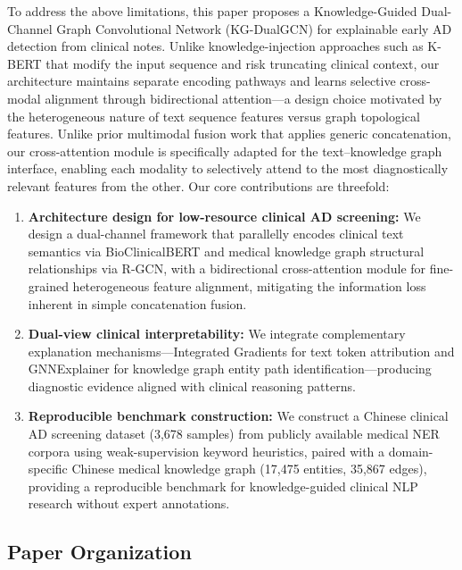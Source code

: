 \documentclass[11pt,onecolumn,a4paper]{article}
\begin{document}
To address the above limitations, this paper proposes a Knowledge-Guided Dual-Channel Graph Convolutional Network (KG-DualGCN) for explainable early AD detection from clinical notes. Unlike knowledge-injection approaches such as K-BERT that modify the input sequence and risk truncating clinical context, our architecture maintains separate encoding pathways and learns selective cross-modal alignment through bidirectional attention---a design choice motivated by the heterogeneous nature of text sequence features versus graph topological features. Unlike prior multimodal fusion work that applies generic concatenation, our cross-attention module is specifically adapted for the text--knowledge graph interface, enabling each modality to selectively attend to the most diagnostically relevant features from the other. Our core contributions are threefold:

\begin{enumerate}[leftmargin=*]
    \item \textbf{Architecture design for low-resource clinical AD screening:} We design a dual-channel framework that parallelly encodes clinical text semantics via BioClinicalBERT and medical knowledge graph structural relationships via R-GCN, with a bidirectional cross-attention module for fine-grained heterogeneous feature alignment, mitigating the information loss inherent in simple concatenation fusion.
    
    \item \textbf{Dual-view clinical interpretability:} We integrate complementary explanation mechanisms---Integrated Gradients for text token attribution and GNNExplainer for knowledge graph entity path identification---producing diagnostic evidence aligned with clinical reasoning patterns.
    
    \item \textbf{Reproducible benchmark construction:} We construct a Chinese clinical AD screening dataset (3,678 samples) from publicly available medical NER corpora using weak-supervision keyword heuristics, paired with a domain-specific Chinese medical knowledge graph (17,475 entities, 35,867 edges), providing a reproducible benchmark for knowledge-guided clinical NLP research without expert annotations.

\end{enumerate}

\subsection{Paper Organization}
\end{document}
